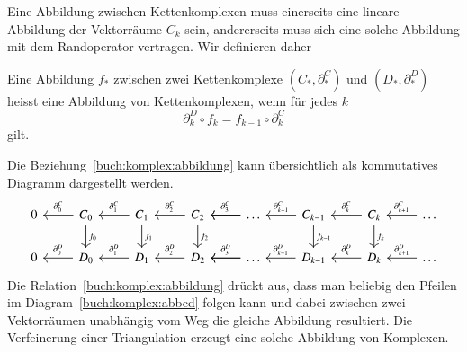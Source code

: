 Eine Abbildung zwischen Kettenkomplexen muss einerseits eine lineare
Abbildung der Vektorräume $C_k$ sein, andererseits muss sich eine
solche Abbildung mit dem Randoperator vertragen.
Wir definieren daher

\begin{definition}
Eine Abbildung $f_*$ zwischen zwei Kettenkomplexe $(C_*,\partial^C_*)$ und 
$(D_*,\partial^D_*)$ heisst eine Abbildung von Kettenkomplexen, wenn
für jedes $k$ 
\begin{equation}
\partial^D_k
\circ
f_{k}
=
f_{k-1}
\circ
\partial^C_k
\label{buch:komplex:abbildung}
\end{equation}
gilt.
\end{definition}

Die Beziehung~\eqref{buch:komplex:abbildung} kann übersichtlich als
kommutatives Diagramm dargestellt werden.
\begin{equation}
\begin{tikzcd}
0 
	& C_0 \arrow[l, "\partial_0^C" above]
		\arrow[d, "f_0"]
		& C_1 \arrow[l,"\partial_1^C" above]
			\arrow[d, "f_1"]
			& C_2 \arrow[l,"\partial_2^C" above]
				\arrow[d, "f_2"]
				& \dots \arrow[l]
					\arrow[l, "\partial_{3}^C" above]
					& C_{k-1}
						\arrow[l, "\partial_{k-1}^C" above]
						\arrow[d, "f_{k-1}"]
						& C_{k}\arrow[l, "\partial_{k}^C" above]
							\arrow[d, "f_{k}"]
							& \dots
								\arrow[l,"\partial_{k+1}^C" above]
\\
0 
	& D_0 \arrow[l, "\partial_0^D" above]
		& D_1 \arrow[l,"\partial_1^D" above]
			& D_2 \arrow[l,"\partial_2^D" above]
				& \dots \arrow[l]
					\arrow[l, "\partial_{3}^D" above]
					& D_{k-1}
						\arrow[l, "\partial_{k-1}^D" above]
						& D_{k}\arrow[l, "\partial_{k}^D" above]
							& \dots
								\arrow[l,"\partial_{k+1}^D" above]
\end{tikzcd}
\label{buch:komplex:abbcd}
\end{equation}
Die Relation~\eqref{buch:komplex:abbildung} drückt aus, dass man beliebig
den Pfeilen im Diagram~\eqref{buch:komplex:abbcd} folgen kann und
dabei zwischen zwei Vektorräumen unabhängig vom Weg die gleiche Abbildung
resultiert.
Die Verfeinerung einer Triangulation erzeugt eine solche Abbildung von
Komplexen.



